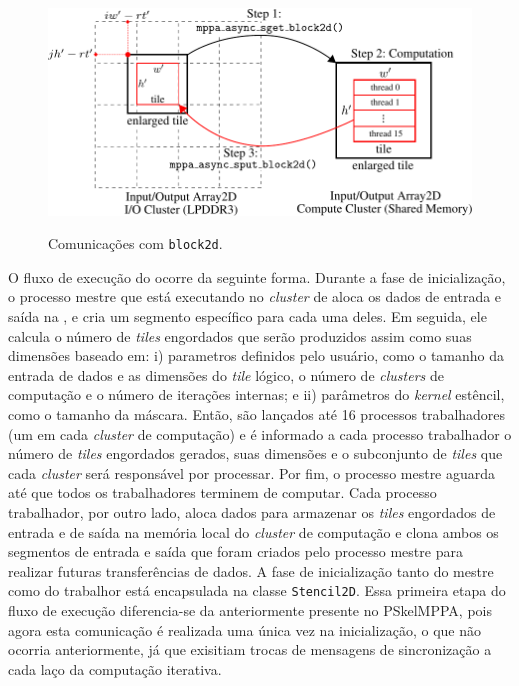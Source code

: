 \begin{figure}[t]
	\centering
	\caption{Comunicações com \texttt{block2d}.}
	\includegraphics[width=1\textwidth]{figs/pskel-mppa-fluxogram.pdf} \\
    \label{fig:block2d}
\end{figure}

O fluxo de execução do \pskelmppa ocorre da seguinte forma. Durante a fase de inicialização, o processo mestre que está executando no \emph{cluster} de \io aloca os dados de entrada e saída na \lpddr, e cria um segmento específico para cada uma deles. Em seguida, ele calcula o número de \emph{tiles} engordados que serão produzidos assim como suas dimensões baseado em: i) parametros definidos pelo usuário, como o tamanho da entrada de dados e as dimensões do \emph{tile} lógico, o número de \emph{clusters} de computação e o número de iterações internas; e ii) parâmetros do \emph{kernel} estêncil, como o tamanho da máscara. Então, são lançados até 16 processos trabalhadores (um em cada \emph{cluster} de computação) e é informado a cada processo trabalhador o número de \emph{tiles} engordados gerados, suas dimensões e o subconjunto de \emph{tiles} que cada \emph{cluster} será responsável por processar. Por fim, o processo mestre aguarda até que todos os trabalhadores terminem de computar.
%
Cada processo trabalhador, por outro lado, aloca dados para armazenar os \emph{tiles} engordados de entrada e de saída na memória local do \emph{cluster} de computação e clona ambos os segmentos de entrada e saída que foram criados pelo processo mestre para realizar futuras transferências de dados. A fase de inicialização tanto do mestre como do trabalhor está encapsulada na classe \texttt{Stencil2D}.
%
Essa primeira etapa do fluxo de execução diferencia-se da anteriormente presente no PSkelMPPA, pois agora esta comunicação é realizada uma única vez na inicialização, o que não ocorria anteriormente, já que exisitiam trocas de mensagens de sincronização a cada laço da computação iterativa.


